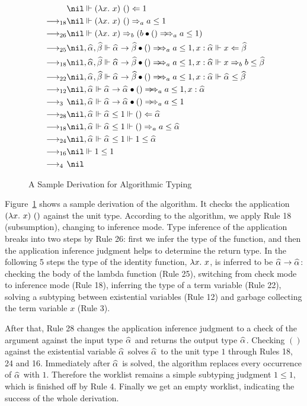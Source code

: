 \begin{figure}
\begin{gather*}
\begin{aligned}
           & \nil \Vdash (\lam x)~() \Lto 1\\
\rrule{18} & \nil \Vdash (\lam x)~() \To_a a\le 1\\
\rrule{26} & \nil \Vdash (\lam x) \To_b (\appInfAlg{b}{()}[a][a\le 1])\\
\rrule{25} & \nil,\al,\bt \Vdash \appInfAlg{\al\to\bt}{()}[a][a\le 1], x:\al \Vdash x\Lto \bt\\
\rrule{18} & \nil,\al,\bt \Vdash \appInfAlg{\al\to\bt}{()}[a][a\le 1], x:\al \Vdash x\To_b b\le \bt\\
\rrule{22} & \nil,\al,\bt \Vdash \appInfAlg{\al\to\bt}{()}[a][a\le 1], x:\al \Vdash \al\le \bt\\
\rrule{12} & \nil,\al \Vdash \appInfAlg{\al\to\al}{()}[a][a\le 1], x:\al\\
\rrule{3}  & \nil,\al \Vdash \appInfAlg{\al\to\al}{()}[a][a\le 1]\\
\rrule{28} & \nil,\al \Vdash \al\le 1 \Vdash () \Lto \al\\
\rrule{18} & \nil,\al \Vdash \al\le 1 \Vdash () \To_a a\le \al\\
\rrule{24} & \nil,\al \Vdash \al\le 1 \Vdash 1\le \al\\
\rrule{16} & \nil \Vdash 1\le 1\\
\rrule{4}  & \nil
\end{aligned}
\end{gather*}
\caption{A Sample Derivation for Algorithmic Typing}
\label{fig:alg:sample}
\end{figure}

Figure~\ref{fig:alg:sample} shows a sample derivation of the algorithm.
It checks the application $(\lam x)~()$ against the unit type.
According to the algorithm, we apply Rule 18 (subsumption), changing to inference mode.
Type inference of the application breaks into two steps by Rule 26:
first we infer the type of the function,
and then the application inference judgment helps to determine the return type.
In the following 5 steps the type of the identity function, $\lam x$, is inferred to be $\al \to \al$:
checking the body of the lambda function (Rule 25),
switching from check mode to inference mode (Rule 18),
inferring the type of a term variable (Rule 22),
solving a subtyping between existential variables (Rule 12) and
garbage collecting the term variable $x$ (Rule 3).

After that, Rule 28 changes the application inference judgment to
a check of the argument against the input type $\al$ and returns the output type $\al$.
Checking $()$ against the existential variable $\al$ solves $\al$ to the unit type $1$
through Rules 18, 24 and 16.
Immediately after $\al$ is solved, the algorithm replaces every occurrence of $\al$ with $1$.
Therefore the worklist remains a simple subtyping judgment $1 \le 1$, which is finished off by Rule 4.
Finally we get an empty worklist, indicating the success of the whole derivation.

